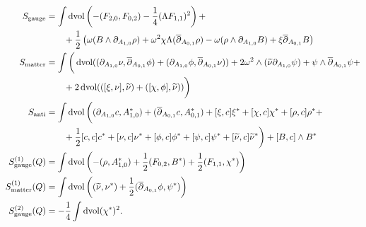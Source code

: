 \documentclass[10pt, oneside]{article}
\begin{document}
\begin{align*}
S_{\mathrm{gauge}} &= \int \operatorname{dvol} \left(-(F_{2, 0}, F_{0, 2}) - \frac{1}{4}(\Lambda F_{1, 1})^2\right) + \\
&\qquad + \frac 12 \left( \omega(B \wedge \partial_{A_{1,0}} \rho) + \omega^2\chi\Lambda(\overline{\partial}_{A_{0,1}} \rho) - \omega(\rho \wedge \partial_{A_{1,0}} B) + \xi \overline{\partial}_{A_{0,1}} B \right)  \\
S_{\mathrm{matter}} &= \int \bigg( \operatorname{dvol} ((\partial_{A_{1,0}}\nu, \overline{\partial}_{A_{0,1}} \phi) + (\partial_{A_{1,0}}\phi, \overline{\partial}_{A_{0,1}} \nu)) + 2\omega^2\wedge(\widetilde{\nu} \partial_{A_{1,0}} \psi) + \psi \wedge \overline{\partial}_{A_{0,1}} \psi + \\
&\qquad + 2\operatorname{dvol}(([\xi,\nu],\widetilde{\nu}) + ([\chi, \phi], \widetilde{\nu}) )   \bigg) \\
S_{\mathrm{anti}} &= \int \operatorname{dvol} \bigg( (\partial_{A_{1, 0}} c, A_{1, 0}^*) + (\overline{\partial}_{A_{0, 1}} c, A_{0, 1}^*)  +  [\xi, c] \xi^* + [\chi, c]\chi^* +[\rho, c] \rho^* + \\
&\qquad + \frac{1}{2}[c, c]c^* + [\nu, c] \nu^* + [\phi, c] \phi^* + [\psi, c] \psi^* + [\widetilde{\nu}, c] \widetilde{\nu}^* \bigg) + [B, c]\wedge B^* \\
S^{(1)}_{\mathrm{gauge}} (Q) &=  \int \operatorname{dvol} \left( - (\rho, A_{1,0}^*) + \frac 12 (F_{0,2},B^*) + \frac 12 (F_{1,1}, \chi^*)  \right)\\
S^{(1)}_{\mathrm{matter}} (Q) &=  \int \operatorname{dvol} \left( (\widetilde{\nu}, \nu^*) + \frac 12( \overline{\partial}_{A_{0,1}} \phi, \psi^*) \right)\\
S^{(2)}_{\mathrm{gauge}} (Q) &= -\frac{1}{4}\int \operatorname{dvol} (\chi^*)^2.
\end{align*}
\end{document}
